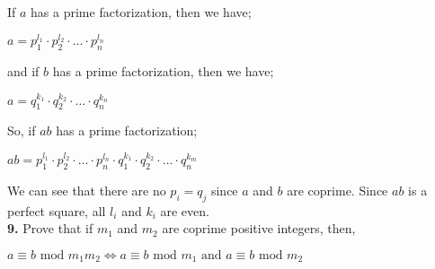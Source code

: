 \documentclass[paper=letter, fontsize=11pt]{scrartcl} %
\begin{document}
If $a$ has a prime factorization, then we have;
\begin{center}
    $a = p_1^{l_1} \cdot p_2^{l_2} \cdot \dots \cdot p_n^{l_n}$
\end{center}
and if $b$ has a prime factorization, then we have;
\begin{center}
$a = q_1^{k_1} \cdot q_2^{k_2} \cdot \dots \cdot q_n^{k_n}$
\end{center}
So, if $ab$ has a prime factorization;
\begin{center}
    $ab = p_1^{l_1} \cdot p_2^{l_2} \cdot \dots \cdot p_n^{l_n} \cdot
    q_1^{k_1} \cdot q_2^{k_2} \cdot \dots \cdot q_n^{k_m}$
\end{center}
We can see that there are no $p_i = q_j$ since $a$ and $b$ are coprime. Since $a b$
is a perfect square, all $l_i$ and $k_i$ are even. 
\\

\textbf{9.} Prove that if $m_1$ and $m_2$ are coprime positive integers, then,

\begin{center}
$a \equiv b \text{ mod } m_1 m_2 \Leftrightarrow a \equiv b \text{ mod } m_1
\text{ and } a \equiv b \text{ mod } m_2$
\end{center}
\end{document}
